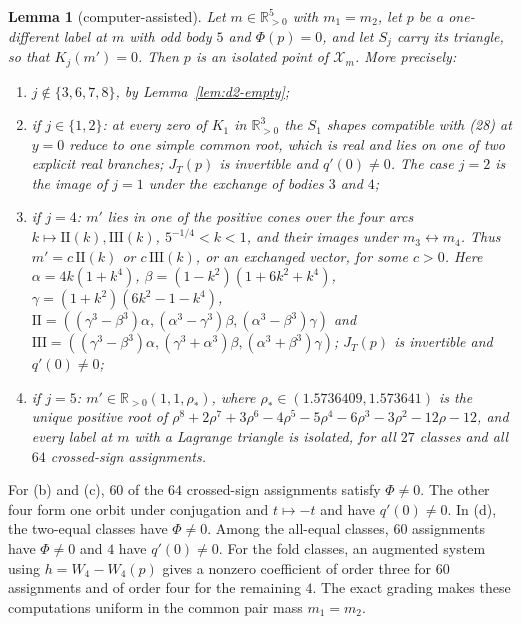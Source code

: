 \documentclass[11pt]{amsart}
\newenvironment{alphalist}{\begin{enumerate}\renewcommand{\labelenumi}{(\alph{enumi})}%
  \renewcommand{\theenumi}{\alph{enumi}}}{\end{enumerate}}
\newtheorem{lemma}[theorem]{Lemma}
\theoremstyle{definition}
\theoremstyle{remark}
\newcommand{\Rp}{\mathbb{R}_{>0}}
\begin{document}
\begin{lemma}[computer-assisted]\label{lem:d2-K}
Let $m\in\Rp^5$ with $m_1=m_2$, let $p$ be a one-different label at $m$ with odd body $5$ and
$\Phi(p)=0$, and let $S_j$ carry its triangle, so that $K_j(m')=0$.  Then $p$ is an isolated
point of $\mathcal X_m$.  More precisely:
\begin{alphalist}
  \item $j\notin\{3,6,7,8\}$, by Lemma~\ref{lem:d2-empty};
  \item if $j\in\{1,2\}$: at every zero of $K_1$ in $\Rp^3$ the $S_1$ shapes compatible with
  \textup{(28)} at $y=0$ reduce to one simple common root, which is real and lies on one of two
  explicit real branches; $J_T(p)$ is invertible and $q'(0)\ne0$.  The case $j=2$ is the image of
  $j=1$ under the exchange of bodies $3$ and $4$;
  \item {if $j=4$: $m'$ lies in one of the positive cones over the four arcs
  $k\mapsto\mathrm{II}(k),\mathrm{III}(k)$, $5^{-1/4}<k<1$, and their images under
  $m_3\leftrightarrow m_4$.  Thus $m'=c\,\mathrm{II}(k)$ or $c\,\mathrm{III}(k)$, or an
  exchanged vector, for some $c>0$.  Here}
  $\alpha=4k(1+k^4)$, $\beta=(1-k^2)(1+6k^2+k^4)$, $\gamma=(1+k^2)(6k^2-1-k^4)$,
  $\mathrm{II}=((\gamma^3-\beta^3)\alpha,(\alpha^3-\gamma^3)\beta,(\alpha^3-\beta^3)\gamma)$ and
  $\mathrm{III}=((\gamma^3-\beta^3)\alpha,(\gamma^3+\alpha^3)\beta,(\alpha^3+\beta^3)\gamma)$;
  $J_T(p)$ is invertible and $q'(0)\ne0$;
  \item if $j=5$: $m'\in\Rp(1,1,\rho_*)$, where $\rho_*\in(1.5736409,1.573641)$ is the unique
  positive root of $\rho^8+2\rho^7+3\rho^6-4\rho^5-5\rho^4-6\rho^3-3\rho^2-12\rho-12$, and every
  label at $m$ with a Lagrange triangle is isolated, for all $27$ classes and all $64$
  crossed-sign assignments.
\end{alphalist}
\end{lemma}

{For (b) and (c), $60$ of the $64$ crossed-sign assignments satisfy
$\Phi\ne0$.  The other four form one orbit under conjugation and $t\mapsto-t$ and have
$q'(0)\ne0$.
In (d), the two-equal classes have $\Phi\ne0$.
Among the all-equal classes, $60$ assignments have $\Phi\ne0$ and $4$ have $q'(0)\ne0$.
For the fold classes, an augmented system using $h=W_4-W_4(p)$ gives a nonzero coefficient
of order three for $60$ assignments and of order four for the remaining $4$.
The exact grading makes these computations uniform in the common pair mass $m_1=m_2$.}
\end{document}
